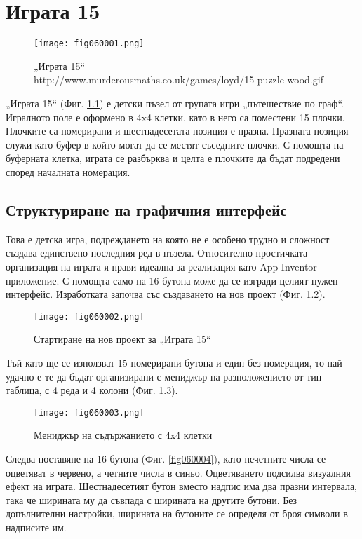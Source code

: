 ﻿\chapter{Играта 15}

\begin{figure}[H]
  \centering
  \texttt{[image: fig060001.png]}
  \caption{„Играта 15“ \\ http://www.murderousmaths.co.uk/games/loyd/15 puzzle wood.gif}
\label{fig060001}
\end{figure}

„Играта 15“ (Фиг. \ref{fig060001}) е детски пъзел от групата игри „пътешествие по граф“. Игралното поле е оформено в 4x4 клетки, като в него са поместени 15 плочки. Плочките са номерирани и шестнадесетата позиция е празна. Празната позиция служи като буфер в който могат да се местят съседните плочки. С помощта на буферната клетка, играта се разбърква и целта е плочките да бъдат подредени според началната номерация. 

\section{Структуриране на графичния интерфейс}

Това е детска игра, подреждането на която не е особено трудно и сложност създава единствено последния ред в пъзела. Относително простичката организация на играта я прави идеална за реализация като App Inventor приложение. С помощта само на 16 бутона може да се изгради целият нужен интерфейс. Изработката започва със създаването на нов проект (Фиг. \ref{fig060002}).

\begin{figure}[H]
  \centering
  \texttt{[image: fig060002.png]}
  \caption{Стартиране на нов проект за „Играта 15“}
\label{fig060002}
\end{figure}

Тъй като ще се използват 15 номерирани бутона и един без номерация, то най-удачно е те да бъдат организирани с мениджър на разположението от тип таблица, с 4 реда и 4 колони (Фиг. \ref{fig060003}).

\begin{figure}[H]
  \centering
  \texttt{[image: fig060003.png]}
  \caption{Мениджър на съдържанието с 4x4 клетки}
\label{fig060003}
\end{figure}

Следва поставяне на 16 бутона (Фиг. \ref{fig060004}), като нечетните числа се оцветяват в червено, а четните числа в синьо. Оцветяването подсилва визуалния ефект на играта. Шестнадесетият бутон вместо надпис има два празни интервала, така че ширината му да съвпада с ширината на другите бутони. Без допълнителни настройки, ширината на бутоните се определя от броя символи в надписите им. 

